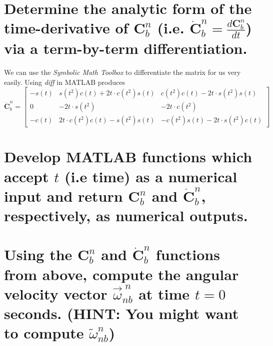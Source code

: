 \documentclass[12pt,letterpaper, onecolumn]{exam}
\begin{document}
\begin{questions}
\begin{parts}
    \end{parts}
    \clearpage
    \begin{parts}
        \part{Determine the analytic form of the time-derivative of $\mathbf{C}^n_b$ (i.e. $\dot{\mathbf{C}}^n_b = \frac{d\mathbf{C}^n_b}{dt}$) via a term-by-term differentiation.}

        We can use the \textit{Symbolic Math Toolbox} to differentiate the matrix for us very easily. Using \textit{diff} in MATLAB produces
        \[\dot{\mathbf{C}}^n_b = \left[\begin{array}{ccc} -s\left(t\right) & s\left(t^2\right)c\left(t\right)+2t\cdot c\left(t^2\right)s\left(t\right) & c\left(t^2\right)c\left(t\right)-2t\cdot s\left(t^2\right)s\left(t\right)\\ 0 & -2t\cdot s\left(t^2\right) & -2t\cdot c\left(t^2\right)\\ -c\left(t\right) & 2t\cdot c\left(t^2\right)c\left(t\right)-s\left(t^2\right)s\left(t\right) & -c\left(t^2\right)s\left(t\right)-2t\cdot s\left(t^2\right)c\left(t\right) \end{array}\right]\]



        \part{Develop MATLAB functions which accept $t$ (i.e time) as a numerical input and return $\mathbf{C}^n_b$ and $\dot{\mathbf{C}}^n_b$, respectively, as numerical outputs.}


        \part{Using the $\mathbf{C}^n_b$ and $\dot{\mathbf{C}}^n_b$ functions from above, compute the angular velocity vector $\vec{\omega}^{\;n}_{nb}$ at time $t = 0$ seconds. (HINT: You might want to compute $\tilde{\omega}^{n}_{nb}$)}


\end{parts}
\end{questions}
\end{document}

